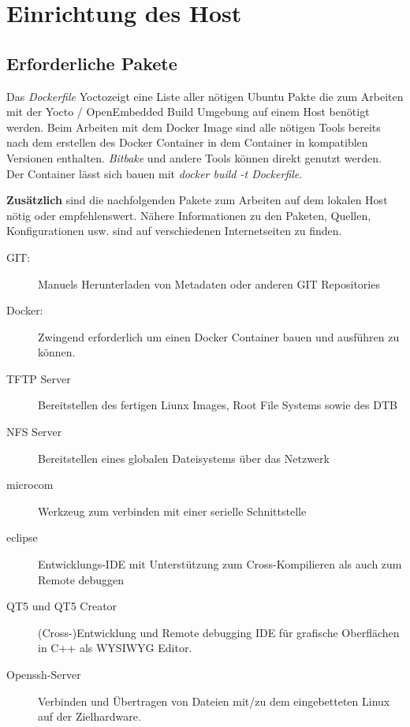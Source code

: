 \chapter{Einrichtung des Host}%
\label{cha:setup_host}


\section{Erforderliche Pakete}%
\label{sec:erforderliche_pakete}

Das \textit{\gls{Dockerfile}} \glqq Yocto\grqq zeigt eine Liste aller nötigen
Ubuntu Pakte die zum Arbeiten mit der Yocto / OpenEmbedded Build Umgebung auf
einem Host benötigt werden. Beim Arbeiten mit dem Docker Image sind alle nötigen
Tools bereits nach dem erstellen des Docker Container in dem Container in
kompatiblen Versionen  enthalten.  \textit{Bitbake} und andere Tools können
direkt genutzt werden.\\ Der Container lässt sich bauen mit \textit{docker build
-t Dockerfile}.

\textbf{Zusätzlich} sind die nachfolgenden Pakete zum Arbeiten auf dem lokalen
Host nötig oder empfehlenswert. Nähere Informationen zu den Paketen, Quellen,
Konfigurationen usw. sind auf verschiedenen Internetseiten zu finden.

\begin{description}
    \item [\gls{GIT}:] Manuels Herunterladen von Metadaten oder anderen GIT
        Repositories
    \item [Docker:] Zwingend erforderlich um einen Docker Container bauen und
        ausführen zu können.
    \item [\gls{TFTP} Server] Bereitstellen des fertigen Liunx Images, Root File
        Systems sowie des \acl{DTB}
    \item [\gls{NFS} Server] Bereitstellen eines globalen Dateisystems über das
        Netzwerk
    \item [microcom] Werkzeug zum verbinden mit einer serielle Schnittstelle
    \item [eclipse] Entwicklungs-IDE mit Unterstützung zum Cross-Kompilieren als
        auch zum Remote debuggen
    \item [QT5 und QT5 Creator] (Cross-)Entwicklung und Remote debugging IDE für
        grafische Oberflächen in C++ als \acs{WYSIWYG} Editor.
    \item [Openssh-Server] Verbinden und Übertragen von Dateien mit/zu dem
        eingebetteten Linux auf der Zielhardware.
\end{description}

